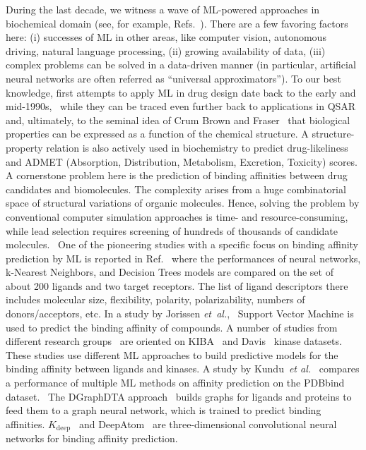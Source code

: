 \documentclass[12pt]{article}
\begin{document}
During the last decade, we witness a wave of ML-powered approaches in biochemical domain (see, for example, Refs.~).
There are a few favoring factors here: (i) successes of ML in other areas, like computer vision, autonomous driving, natural language processing, (ii) growing availability of data, (iii) complex problems can be solved in a data-driven manner (in particular, artificial neural networks are often referred as ``universal approximators'').
To our best knowledge, first attempts to apply ML in drug design date back to the early and mid-1990s,~\cite{Bolis1991,Jain1994,Clark1995} while they can be traced even further back to applications in QSAR~\cite{Hansch1964,King1993,Grover2000,Gad2014} and, ultimately, to the seminal idea of Crum Brown and Fraser~\cite{CrumBrown1868} that biological properties can be expressed as a function of the chemical structure.
A structure-property relation is also actively used in biochemistry to predict drug-likeliness and ADMET (Absorption, Distribution, Metabolism, Excretion, Toxicity) scores.
A cornerstone problem here is the prediction of binding affinities between drug candidates and biomolecules.
The complexity arises from a huge combinatorial space of structural variations of organic molecules.
Hence, solving the problem by conventional computer simulation approaches is time- and resource-consuming, while lead selection requires screening of hundreds of thousands of candidate molecules.~\cite{Steinhauser2009}
One of the pioneering studies with a specific focus on binding affinity prediction by ML is reported in Ref.~ where the performances of neural networks, k-Nearest Neighbors, and Decision Trees models are compared on the set of about 200 ligands and two target receptors.
The list of ligand descriptors there includes molecular size, flexibility, polarity, polarizability, numbers of donors/acceptors, etc.
In a study by Jorissen \textit{et~al.},~\cite{Jorissen2005} Support Vector Machine is used to predict the binding affinity of compounds.
A number of studies from different research groups~\cite{Pahikkala2014,He2017,Ozturk2018,Ozturk2019,Shin2019,Nguyen2020,Shim2021} are oriented on KIBA~\cite{Tang2014} and Davis~\cite{Davis2011} kinase datasets.
These studies use different ML approaches to build predictive models for the binding affinity between ligands and kinases.
A study by Kundu~\textit{et al.}~\cite{Kundu2018} compares a performance of multiple ML methods on affinity prediction on the PDBbind dataset.~\cite{PDBbind:www,Wang2004,Liu2017}
The DGraphDTA approach~\cite{Jiang2020} builds graphs for ligands and proteins to feed them to a graph neural network, which is trained to predict binding affinities.
$K_\textrm{deep}$~\cite{Jimenez2018} and DeepAtom~\cite{YLi2019} are three-dimensional convolutional neural networks for binding affinity prediction.
\end{document}
